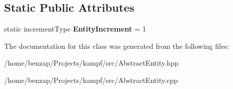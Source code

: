 \subsection*{Static Public Attributes}
\begin{DoxyCompactItemize}
\item 
\hypertarget{classAbstractEntity_ac34790789d4a190b0c0f48879deaa9db}{static increment\-Type {\bfseries Entity\-Increment} = 1}\label{classAbstractEntity_ac34790789d4a190b0c0f48879deaa9db}

\end{DoxyCompactItemize}


The documentation for this class was generated from the following files\-:\begin{DoxyCompactItemize}
\item 
/home/benzap/\-Projects/kampf/src/Abstract\-Entity.\-hpp\item 
/home/benzap/\-Projects/kampf/src/Abstract\-Entity.\-cpp\end{DoxyCompactItemize}
